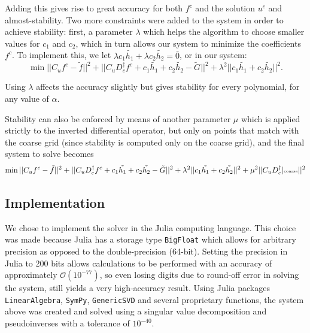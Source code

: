\documentclass[11pt]{amsart}
\begin{document}
Adding this gives rise to great accuracy for both $f^c$ and the solution $u^c$ and almost-stability.  Two more constraints were added to the system in order to achieve stability: first, a parameter $\lambda$ which helps the algorithm to choose smaller values for $c_1$ and $c_2$,  which in turn allows our system to minimize the coefficients $f^c$. To implement this, we let $\lambda c_1 \tilde{h_1} + \lambda c_2 \tilde{h_2} = \bar{0}$, or in our system:
\begin{equation}
\min ||C_u f^c - \tilde{f}|| ^2 + ||C_u D_c^{\dagger} f^c +c_1\tilde{h_1}+c_2\tilde{h_2}- \tilde{G}||^2 + \lambda^2|| c_1 \tilde{h_1} + c_2 \tilde{h_2} ||^2.
\end{equation}

Using $\lambda$ affects the accuracy slightly but gives stability for every polynomial, for any value of $\alpha$.  

Stability can also be enforced by means of another parameter $\mu$ which is applied strictly to the inverted differential operator, but only on points that match with the coarse grid (since stability is computed only on the coarse grid), and the final system to solve becomes
\begin{equation}
\min ||C_u f^c - \tilde{f}|| ^2 + ||C_u D_c^{\dagger} f^c +c_1\tilde{h_1}+c_2\tilde{h_2}- \tilde{G}||^2 + \lambda^2|| c_1 \tilde{h_1} + c_2 \tilde{h_2} ||^2 + \mu^2||C_u D_c^{\dagger}|{\text{\tiny{coarse}}}  ||^2
\end{equation}


\subsection{Implementation}
We chose to implement the solver in the Julia computing language.  This choice was made because Julia has a storage type \texttt{BigFloat} which allows for arbitrary precision as opposed to the double-precision (64-bit).  Setting the precision in Julia to 200 bits allows calculations to be performed with an accuracy of approximately $\mathcal{O}(10^{-77})$, so even losing digits due to round-off error in solving the system, still yields a very high-accuracy result.  Using Julia packages \texttt{LinearAlgebra}, \texttt{SymPy}, \texttt{GenericSVD} and several proprietary functions,  the system above was created and solved using a singular value decomposition and pseudoinverses with a tolerance of $10^{-40}$.  
\end{document}
